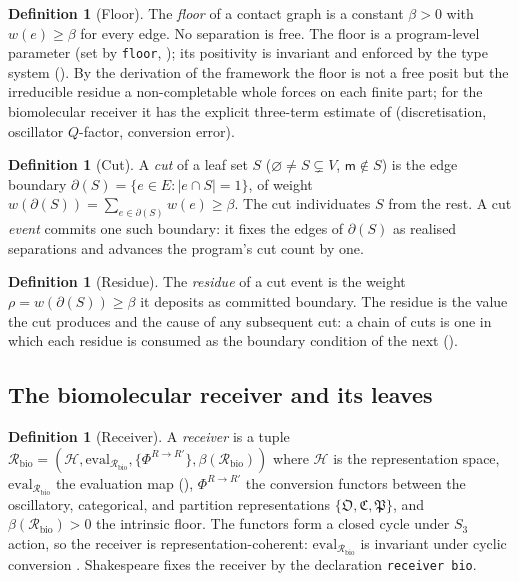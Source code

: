 \documentclass[11pt,a4paper]{article}
\theoremstyle{thmstyle}
\theoremstyle{definition}
\newtheorem{definition}[theorem]{Definition}
\theoremstyle{remark}
\newcommand{\flo}{\beta}
\newcommand{\res}{\rho}
\newcommand{\cut}{\partial}
\newcommand{\medium}{\mathsf{m}}
\newcommand{\Recv}{\mathcal{R}_{\mathrm{bio}}}
\newcommand{\eval}{\mathrm{eval}}
\newcommand{\shk}[1]{\texttt{#1}}
\newcommand{\abs}[1]{\lvert#1\rvert}
\newcommand{\Osc}{\mathfrak{O}}
\newcommand{\Cat}{\mathfrak{C}}
\newcommand{\Part}{\mathfrak{P}}
\begin{document}
\begin{definition}[Floor]
\label{def:floor}
The \emph{floor} of a contact graph is a constant $\flo>0$ with
$w(e)\ge\flo$ for every edge. No separation is free. The floor is a
program-level parameter (set by \shk{floor}, ); its
positivity is invariant and enforced by the type system
(). By the derivation of the framework
\citep{sachikonye2025graphs,sachikonye2025causal} the floor is not a free
posit but the irreducible residue a non-completable whole forces on each
finite part; for the biomolecular receiver it has the explicit
three-term estimate of \citep{sachikonye2025expralg}
(discretisation, oscillator $Q$-factor, conversion error).
\end{definition}

\begin{definition}[Cut]
\label{def:cut}
A \emph{cut} of a leaf set $S$ ($\varnothing\neq S\subsetneq V$,
$\medium\notin S$) is the edge boundary
$\cut(S)=\{e\in E:\abs{e\cap S}=1\}$, of weight
$w(\cut(S))=\sum_{e\in\cut(S)}w(e)\ge\flo$. The cut individuates $S$ from
the rest. A cut \emph{event} commits one such boundary: it fixes the edges
of $\cut(S)$ as realised separations and advances the program's cut count
by one.
\end{definition}

\begin{definition}[Residue]
\label{def:residue}
The \emph{residue} of a cut event is the weight $\res=w(\cut(S))\ge\flo$ it
deposits as committed boundary. The residue is the value the cut produces
and the cause of any subsequent cut: a chain of cuts is one in which each
residue is consumed as the boundary condition of the next
().
\end{definition}

\subsection{The biomolecular receiver and its leaves}

\begin{definition}[Receiver]
\label{def:receiver}
A \emph{receiver} is a tuple
$\Recv=(\mathcal{H}, \eval_{\Recv}, \{\Phi^{R\to R'}\}, \flo(\Recv))$ where
$\mathcal{H}$ is the representation space, $\eval_{\Recv}$ the evaluation
map (), $\Phi^{R\to R'}$ the conversion functors
between the oscillatory, categorical, and partition representations
$\{\Osc,\Cat,\Part\}$, and $\flo(\Recv)>0$ the intrinsic floor. The
functors form a closed cycle under $S_3$ action, so the receiver is
representation-coherent: $\eval_{\Recv}$ is invariant under cyclic
conversion \citep{sachikonye2025expralg}. Shakespeare fixes the receiver
by the declaration \shk{receiver\ bio}.
\end{definition}
\end{document}
